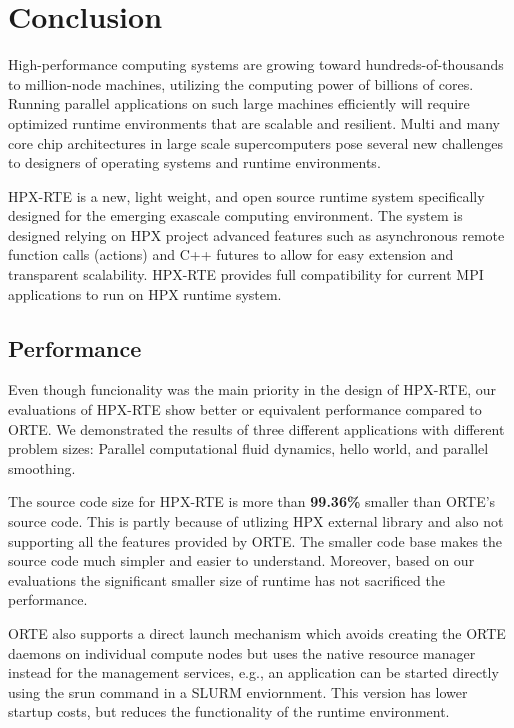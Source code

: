 \chapter{Conclusion}
\label{sec:Conclusion}

High-performance computing systems are growing toward hundreds-of-thousands to million-node machines, utilizing the computing power of billions of cores. Running parallel applications on such large machines efficiently will require optimized runtime environments that are scalable and resilient. Multi and many core chip architectures in large scale supercomputers pose several new challenges to designers of operating systems and runtime environments.

HPX-RTE is a new, light weight, and open source runtime system specifically designed for the emerging exascale computing environment. The system is designed relying on HPX project advanced features such as asynchronous remote function calls (actions) and C++ futures to allow for easy extension and transparent scalability. HPX-RTE provides full compatibility for current MPI applications to run on HPX runtime system. 

\section{Performance}
Even though funcionality was the main priority in the design of HPX-RTE, our evaluations of HPX-RTE show better or equivalent performance compared to ORTE. We demonstrated the results of three different applications with different problem sizes: Parallel computational fluid dynamics, hello world, and parallel smoothing.

The source code size for HPX-RTE is more than \textbf{99.36\%} smaller than ORTE's source code. This is partly because of utlizing HPX external library and also not supporting all the features provided by ORTE. The smaller code base makes the source code much simpler and easier to understand. Moreover, based on our evaluations the significant smaller size of runtime has not sacrificed the performance.

ORTE also supports a direct launch mechanism which avoids creating the ORTE daemons on individual compute nodes but uses the native resource manager instead for the management services, e.g., an application can be started directly using the srun command in a SLURM enviornment. This version has lower startup costs, but reduces the functionality of the runtime environment.


